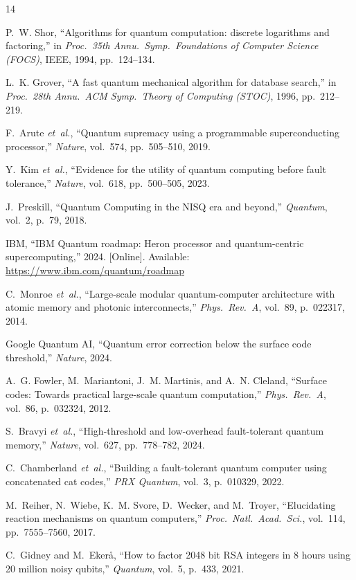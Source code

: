 \documentclass[conference]{IEEEtran}
\begin{document}

\begin{thebibliography}{14}

P.~W. Shor, ``Algorithms for quantum computation: discrete logarithms and factoring,'' in \emph{Proc.\ 35th Annu.\ Symp.\ Foundations of Computer Science (FOCS)}, IEEE, 1994, pp.~124--134.

L.~K. Grover, ``A fast quantum mechanical algorithm for database search,'' in \emph{Proc.\ 28th Annu.\ ACM Symp.\ Theory of Computing (STOC)}, 1996, pp.~212--219.

F.~Arute \emph{et~al.}, ``Quantum supremacy using a programmable superconducting processor,'' \emph{Nature}, vol.~574, pp.~505--510, 2019.

Y.~Kim \emph{et~al.}, ``Evidence for the utility of quantum computing before fault tolerance,'' \emph{Nature}, vol.~618, pp.~500--505, 2023.

J.~Preskill, ``Quantum Computing in the NISQ era and beyond,'' \emph{Quantum}, vol.~2, p.~79, 2018.

IBM, ``IBM Quantum roadmap: Heron processor and quantum-centric supercomputing,'' 2024. [Online]. Available: \url{https://www.ibm.com/quantum/roadmap}

C.~Monroe \emph{et~al.}, ``Large-scale modular quantum-computer architecture with atomic memory and photonic interconnects,'' \emph{Phys.\ Rev.\ A}, vol.~89, p.~022317, 2014.

Google Quantum AI, ``Quantum error correction below the surface code threshold,'' \emph{Nature}, 2024.

A.~G. Fowler, M.~Mariantoni, J.~M. Martinis, and A.~N. Cleland, ``Surface codes: Towards practical large-scale quantum computation,'' \emph{Phys.\ Rev.\ A}, vol.~86, p.~032324, 2012.

S.~Bravyi \emph{et~al.}, ``High-threshold and low-overhead fault-tolerant quantum memory,'' \emph{Nature}, vol.~627, pp.~778--782, 2024.

C.~Chamberland \emph{et~al.}, ``Building a fault-tolerant quantum computer using concatenated cat codes,'' \emph{PRX Quantum}, vol.~3, p.~010329, 2022.

M.~Reiher, N.~Wiebe, K.~M. Svore, D.~Wecker, and M.~Troyer, ``Elucidating reaction mechanisms on quantum computers,'' \emph{Proc.\ Natl.\ Acad.\ Sci.}, vol.~114, pp.~7555--7560, 2017.

C.~Gidney and M.~Eker\aa{}, ``How to factor 2048 bit RSA integers in 8 hours using 20 million noisy qubits,'' \emph{Quantum}, vol.~5, p.~433, 2021.

\end{thebibliography}
\end{document}
